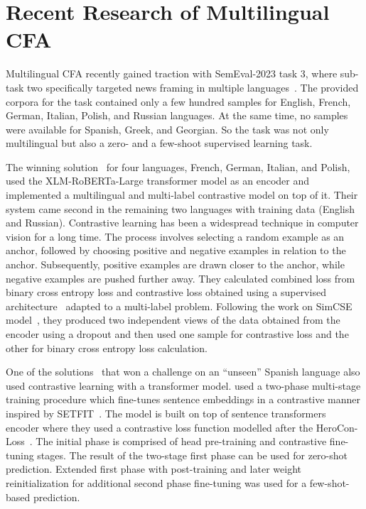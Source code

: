\section{Recent Research of Multilingual CFA}
Multilingual CFA recently gained traction with SemEval-2023 task 3, where sub-task two specifically targeted news framing in multiple languages~\parencite{piskorski-etal-2023-semeval-task3}. 
The provided corpora for the task contained only a few hundred samples for English, French, German, Italian, Polish, and Russian languages. 
At the same time, no samples were available for Spanish, Greek, and Georgian.
So the task was not only multilingual but also a zero- and a few-shoot supervised learning task.

The winning solution~\parencite{liao2023marseclipse} for four languages, French, German, Italian, and Polish, used the XLM-RoBERTa-Large transformer model as an encoder and implemented a multilingual and multi-label contrastive model on top of it.
Their system came second in the remaining two languages with training data (English and Russian).
Contrastive learning has been a widespread technique in computer vision for a long time. 
The process involves selecting a random example as an anchor, followed by choosing positive and negative examples in relation to the anchor. 
Subsequently, positive examples are drawn closer to the anchor, while negative examples are pushed further away.
They calculated combined loss from binary cross entropy loss and contrastive loss obtained using a supervised architecture~\parencite{khosla2021supervised} adapted to a multi-label problem.
Following the work on SimCSE model~\parencite{gao2022simcse}, they produced two independent views of the data obtained from the encoder using a dropout and then used one sample for contrastive loss and the other for binary cross entropy loss calculation.

One of the solutions~\parencite{reiterhaas2023mcpt} that won a challenge on an ``unseen'' Spanish language also used contrastive learning with a transformer model.
\textcite{reiterhaas2023mcpt} used a two-phase multi-stage training procedure which fine-tunes sentence embeddings in a contrastive manner inspired by SETFIT~\parencite{tunstall2022efficient}. 
The model is built on top of sentence transformers~\parencite{reimers-2019-sentence-bert} encoder where they used a contrastive loss function modelled after the HeroCon-Loss~\parencite{zheng-etal-2022-contrastive}.
The initial phase is comprised of head pre-training and contrastive fine-tuning stages. 
The result of the two-stage first phase can be used for zero-shot prediction. 
Extended first phase with post-training and later weight reinitialization for additional second phase fine-tuning was used for a few-shot-based prediction.

